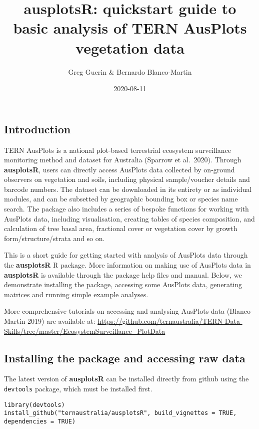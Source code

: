\documentclass[
]{article}
\title{ausplotsR: quickstart guide to basic analysis of TERN AusPlots
vegetation data}
\author{Greg Guerin \& Bernardo Blanco-Martin}
\date{2020-08-11}
\begin{document}
\maketitle

\hypertarget{introduction}{%
\subsection{Introduction}\label{introduction}}

TERN AusPlots is a national plot-based terrestrial ecosystem
surveillance monitoring method and dataset for Australia (Sparrow et
al.~2020). Through \textbf{ausplotsR}, users can directly access
AusPlots data collected by on-ground observers on vegetation and soils,
including physical sample/voucher details and barcode numbers. The
dataset can be downloaded in its entirety or as individual modules, and
can be subsetted by geographic bounding box or species name search. The
package also includes a series of bespoke functions for working with
AusPlots data, including visualisation, creating tables of species
composition, and calculation of tree basal area, fractional cover or
vegetation cover by growth form/structure/strata and so on.

This is a short guide for getting started with analysis of AusPlots data
through the \textbf{ausplotsR} R package. More information on making use
of AusPlots data in \textbf{ausplotsR} is available through the package
help files and manual. Below, we demonstrate installing the package,
accessing some AusPlots data, generating matrices and running simple
example analyses.

More comprehensive tutorials on accessing and analysing AusPlots data
(Blanco-Martin 2019) are available at:
\url{https://github.com/ternaustralia/TERN-Data-Skills/tree/master/EcosystemSurveillance_PlotData}

\hypertarget{installing-the-package-and-accessing-raw-data}{%
\subsection{Installing the package and accessing raw
data}\label{installing-the-package-and-accessing-raw-data}}

The latest version of \textbf{ausplotsR} can be installed directly from
github using the \texttt{devtools} package, which must be installed
first.

\begin{verbatim}
library(devtools)
install_github("ternaustralia/ausplotsR", build_vignettes = TRUE, dependencies = TRUE)
\end{verbatim}
\end{document}
